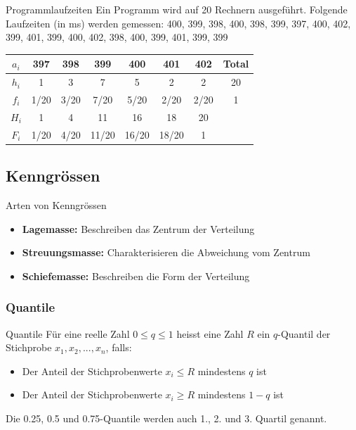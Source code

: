 \begin{example2}{Programmlaufzeiten}%
Ein Programm wird auf 20 Rechnern ausgeführt. Folgende Laufzeiten (in ms) werden gemessen:
400, 399, 398, 400, 398, 399, 397, 400, 402, 399, 401, 399, 400, 402, 398, 400, 399, 401, 399, 399

\begin{center}
\begin{tabular}{|c|c|c|c|c|c|c|c|}
\hline
$a_i$ & 397 & 398 & 399 & 400 & 401 & 402 & Total \\
\hline
$h_i$ & 1 & 3 & 7 & 5 & 2 & 2 & 20 \\
\hline
$f_i$ & 1/20 & 3/20 & 7/20 & 5/20 & 2/20 & 2/20 & 1 \\
\hline
$H_i$ & 1 & 4 & 11 & 16 & 18 & 20 & \\
\hline
$F_i$ & 1/20 & 4/20 & 11/20 & 16/20 & 18/20 & 1 & \\
\hline
\end{tabular}
\end{center}
\end{example2}






\subsection{Kenngrössen}

\begin{concept}{Arten von Kenngrössen}
\begin{itemize}
    \item \textbf{Lagemasse:} Beschreiben das Zentrum der Verteilung
    \item \textbf{Streuungsmasse:} Charakterisieren die Abweichung vom Zentrum
    \item \textbf{Schiefemasse:} Beschreiben die Form der Verteilung
\end{itemize}
\end{concept}



\subsubsection{Quantile}

\begin{definition}{Quantile}
Für eine reelle Zahl $0 \leq q \leq 1$ heisst eine Zahl $R$ ein $q$-Quantil der Stichprobe $x_1, x_2, ..., x_n$, falls:
\begin{itemize}
    \item Der Anteil der Stichprobenwerte $x_i \leq R$ mindestens $q$ ist
    \item Der Anteil der Stichprobenwerte $x_i \geq R$ mindestens $1-q$ ist
\end{itemize}

Die 0.25, 0.5 und 0.75-Quantile werden auch 1., 2. und 3. Quartil genannt.
\end{definition}

